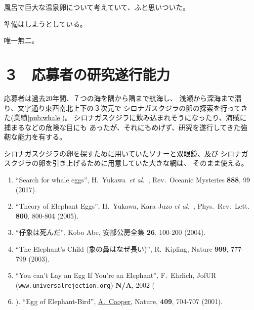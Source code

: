 \documentclass[11pt,a4j,dvipdfmx]{jarticle} 					%
\newcommand{\研究課題名}{象の卵}
\newcommand{\研究機関名}{逢坂大学}
\newcommand{\研究代表者氏名}{湯川秀樹}
\newcommand{\研究期間の最終元号年度}{5}  %
\newcommand{\paper}[6]{%
	\item ``#1'', #2, #3 {\bf #4}, #5 (#6).			%
}
\newcommand{\etal}{\textit{et al.\ }}
\newcommand{\yukawa}{H.~Yukawa}					%
\newcommand{\prl}{Phys.\ Rev.\ Lett.\ }		%
\begin{document}
		風呂で巨大な温泉卵について考えていて、ふと思いついた。

	準備はしようとしている。

	唯一無二。




\section{３　応募者の研究遂行能力}

\PapersInstructions	%

	応募者は過去20年間、７つの海を隅から隅まで航海し、
	浅瀬から深海まで潜り、文字通り東西南北上下の３次元で
	シロナガスクジラの卵の探索を行ってきた(業績\ref{pub:whale})。
	シロナガスクジラに飲み込まれそうになったり、海賊に捕まるなどの危険な目にも
	あったが、それにもめげず、研究を遂行してきた強靭な能力を有する。

	シロナガスクジラの卵を探すために用いていたソナーと双眼鏡、及び
	シロナガスクジラの卵を引き上げるために用意していた大きな網は、
	そのまま使える。
	\begin{enumerate}
		\paper{Search for whale eggs}{\yukawa\ \etal}{Rev.\ Oceanic Mysteries}{888}{99}{2017}
			\label{pub:whale}
				
		\paper{Theory of Elephant Eggs}{\yukawa, Kara Juzo \etal}{\prl}{800}{800-804}{2005}
			\label{pub:theoegg}
				
		\paper{仔象は死んだ}{Kobo Abe}{安部公房全集}{26}{100-200}{2004}
		
		\paper{The Elephant's Child (象の鼻はなぜ長い)}{R.~Kipling}{Nature}{999}{777-799}{2003}

		\paper{You can't Lay an Egg If You're an Elephant}{F.~Ehrlich}
			{JofUR\\({\tt www.universalrejection.org})}{{\bf N/A}}{2002}
		
		\item ``Egg of Elephant-Bird'', 
				\underline{A.~Cooper},
				Nature, {\bf 409}, 704-707 (2001).	%
	\end{enumerate}
\end{document}
